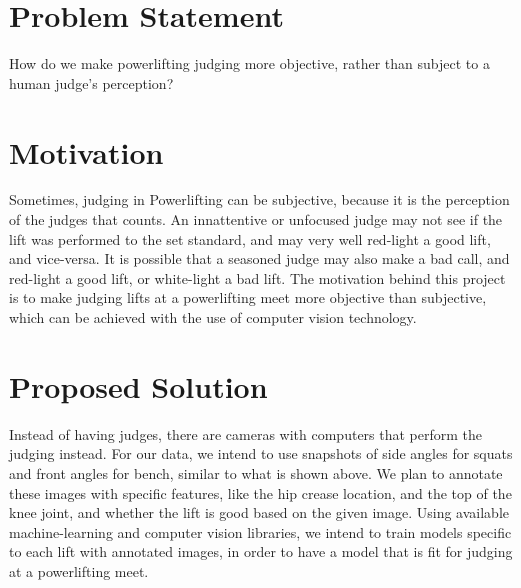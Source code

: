 \documentclass{article}
\begin{document}
\section{Problem Statement}
How do we make powerlifting judging more objective, rather than subject to a human judge's perception?
\section{Motivation}
Sometimes, judging in Powerlifting can be subjective, because it is the perception of the judges that counts.  An innattentive or unfocused judge may not see if the lift was performed to the set standard, and may very well red-light a good lift, and vice-versa. It is possible that a seasoned judge may also make a bad call, and red-light a good lift, or white-light a bad lift. The motivation behind this project is to make judging lifts at a powerlifting meet more objective than subjective, which can be achieved with the use of computer vision technology. 
\section{Proposed Solution}
Instead of having judges, there are cameras with computers that perform the judging instead. For our data, we intend to use snapshots of side angles for squats and front angles for bench, similar to what is shown above. We plan to annotate these images with specific features, like the hip crease location, and the top of the knee joint, and whether the lift is good based on the given image. Using available machine-learning and computer vision libraries, we intend to train models specific to each lift with annotated images, in order to have a model that is fit for judging at a powerlifting meet. 
\end{document}

